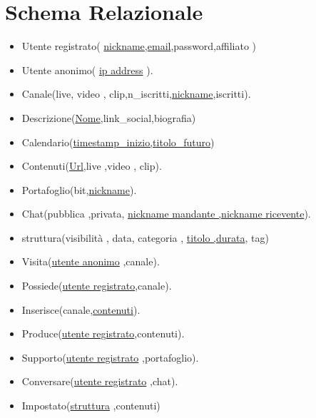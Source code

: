 \section{Schema Relazionale}
\begin{itemize}
    \item Utente registrato( \underline{nickname},\underline{email},password,affiliato  )
    \item Utente anonimo( \underline{ip address} ).
    \item Canale(live, video , clip,n\_iscritti,\underline{nickname},iscritti).
    \item Descrizione(\underline{Nome},link\_social,biografia) 
    \item Calendario(\underline{timestamp\_inizio,titolo\_futuro})
    \item Contenuti(\underline{Url},live ,video , clip).
    \item Portafoglio(bit,\underline{nickname}). 
    \item Chat(pubblica ,privata, \underline{nickname mandante ,nickname ricevente}). 
    \item struttura(visibilità , data, categoria , \underline{titolo ,durata}, tag)
    \item Visita(\underline{utente anonimo} ,canale).
    \item Possiede(\underline{utente registrato},canale).
    \item Inserisce(canale,\underline{contenuti}).
    \item Produce(\underline{utente registrato},contenuti).
    \item Supporto(\underline{utente registrato} ,portafoglio).
    \item Conversare(\underline{utente registrato} ,chat).
    \item Impostato(\underline{struttura} ,contenuti)
\end{itemize}